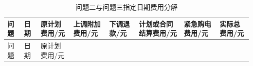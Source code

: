 \documentclass[zihao=-4,a4paper,UTF8,fontset=none]{ctexart}
\begin{document}
\begin{longtable}[]{@{}
  >{\centering\arraybackslash}p{}
  >{\centering\arraybackslash}p{}
  >{\centering\arraybackslash}p{}
  >{\centering\arraybackslash}p{}
  >{\centering\arraybackslash}p{}
  >{\centering\arraybackslash}p{}
  >{\centering\arraybackslash}p{}
  >{\centering\arraybackslash}p{}@{}}
\caption{问题二与问题三指定日期费用分解}\label{tab:appendix-B-6}\tabularnewline
\toprule\noalign{}
\begin{minipage}[b]{\linewidth}\centering
问题
\end{minipage} & \begin{minipage}[b]{\linewidth}\centering
日期
\end{minipage} & \begin{minipage}[b]{\linewidth}\centering
原计划费用/元
\end{minipage} & \begin{minipage}[b]{\linewidth}\centering
上调附加费用/元
\end{minipage} & \begin{minipage}[b]{\linewidth}\centering
下调退款/元
\end{minipage} & \begin{minipage}[b]{\linewidth}\centering
计划或合同结算费用/元
\end{minipage} & \begin{minipage}[b]{\linewidth}\centering
紧急购电费用/元
\end{minipage} & \begin{minipage}[b]{\linewidth}\centering
实际总费用/元
\end{minipage} \\
\midrule\noalign{}
\endfirsthead
\toprule\noalign{}
\begin{minipage}[b]{\linewidth}\centering
问题
\end{minipage} & \begin{minipage}[b]{\linewidth}\centering
日期
\end{minipage} & \begin{minipage}[b]{\linewidth}\centering
原计划费用/元
\end{minipage} & \begin{minipage}[b]{\linewidth}\centering

\end{minipage}
\end{longtable}
\end{document}
